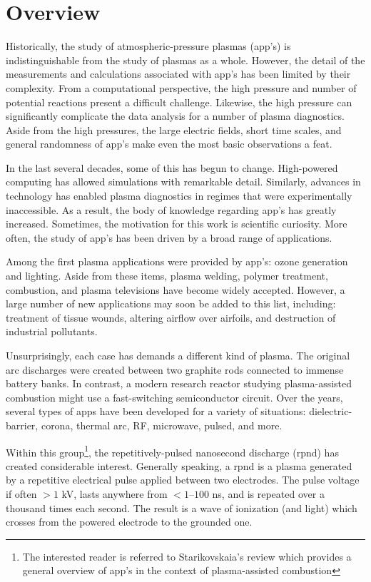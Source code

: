 \section{Overview}

Historically, the study of atmospheric-pressure plasmas (\acs{app}'s) is
indistinguishable from the study of plasmas as a whole. However, the detail of
the measurements and calculations associated with \acs{app}'s has been limited
by their complexity. From a computational perspective, the high pressure and
number of potential reactions present a difficult challenge. Likewise, the high
pressure can significantly complicate the data analysis for a number of plasma
diagnostics. Aside from the high pressures, the large electric fields, short
time scales, and general randomness of \acs{app}'s make even the most basic
observations a feat.

In the last several decades, some of this has begun to change. High-powered
computing has allowed simulations with remarkable detail. Similarly, advances in
technology has enabled plasma diagnostics in regimes that were experimentally
inaccessible. As a result, the body of knowledge regarding \acs{app}'s has
greatly increased. Sometimes, the motivation for this work is scientific
curiosity. More often, the study of \acs{app}'s has been driven by a broad range
of applications.

Among the first plasma applications were provided by \acs{app}'s: ozone
generation and lighting. Aside from these items, plasma welding, polymer
treatment, combustion, and plasma televisions have become widely accepted.
However, a large number of new applications may soon be added to this list,
including: treatment of tissue wounds, altering airflow over airfoils, and
destruction of industrial pollutants.

Unsurprisingly, each case has demands a different kind of plasma. The original
arc discharges were created between two graphite rods connected to immense
battery banks. In contrast, a modern research reactor studying plasma-assisted
combustion might use a fast-switching semiconductor circuit. Over the years,
several types of \acs{app}s have been developed for a variety of situations:
dielectric-barrier, corona, thermal arc, RF, microwave, pulsed, and more.

Within this group\footnote{The interested reader is referred to Starikovskaia's
review \cite{Starikovskaia2006} which provides a general overview of \acs{app}'s
in the context of plasma-assisted combustion}, the repetitively-pulsed
nanosecond discharge (\acs{rpnd}) has created considerable interest. Generally
speaking, a \acs{rpnd} is a plasma generated by a repetitive electrical pulse
applied between two electrodes. The pulse voltage if often $>1$ kV, lasts
anywhere from $<1$--$100$ ns, and is repeated over a thousand times each second.
The result is a wave of ionization (and light) which crosses from the powered
electrode to the grounded one.


